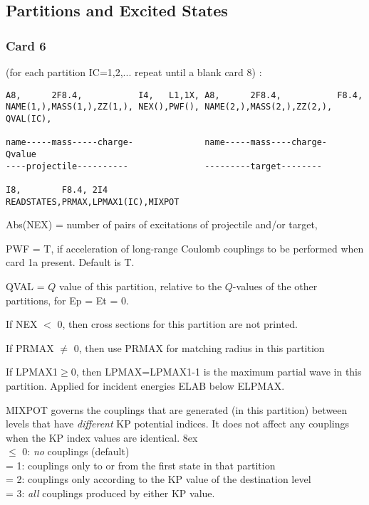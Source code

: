 \documentclass[11pt]{article}
\begin{document}

\newpage
\subsection{Partitions and Excited States}
%
\subsubsection*{Card 6}
(for each partition IC=1,2,... repeat until a blank card 8) :
\begin{verbatim}
A8,      2F8.4,           I4,   L1,1X, A8,      2F8.4,           F8.4,
NAME(1,),MASS(1,),ZZ(1,), NEX(),PWF(), NAME(2,),MASS(2,),ZZ(2,), QVAL(IC),

name-----mass-----charge-              name-----mass----charge-  Qvalue   
----projectile----------               ---------target--------

I8,        F8.4, 2I4
READSTATES,PRMAX,LPMAX1(IC),MIXPOT

\end{verbatim}

Abs(NEX) = number of pairs of excitations of projectile and/or target,

PWF = T, if acceleration of long-range Coulomb couplings to be
performed when card 1a present. Default is T.

QVAL = $Q$ value of this partition,
relative to the $Q$-values of the other partitions, for Ep = Et = 0.

If NEX $<$ 0, then cross sections for this partition are not printed.

If PRMAX $\ne$ 0, then use PRMAX for matching radius in this partition

If LPMAX1$\geq$0, then LPMAX=LPMAX1-1 is the maximum partial wave in this partition.
Applied for incident energies ELAB below ELPMAX.

MIXPOT governs the couplings that are generated (in this partition) between levels that have {\em different} KP potential indices.
It does not affect any couplings when the KP index values are identical.
\hangindent 8ex
\\ $\leq$ 0: {\em no} couplings (default)
\\ = 1:  couplings only to or from the first state in that partition
\\ = 2:  couplings only according to the KP value of the destination level
\\ = 3:  {\em all} couplings produced by either KP value.
\end{document}

